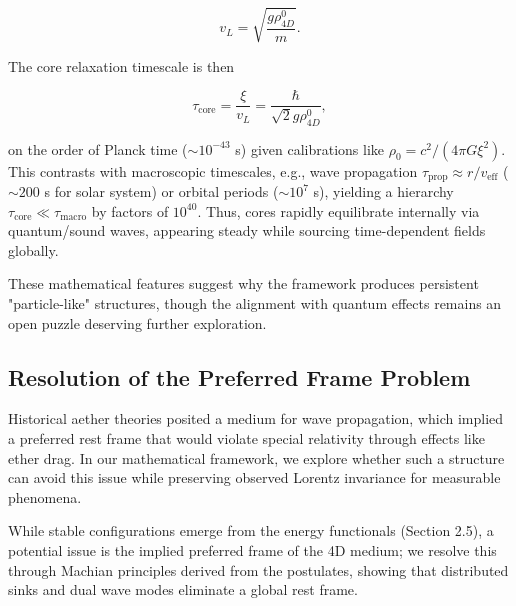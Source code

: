 \[
v_L = \sqrt{\frac{g \rho_{4D}^0}{m}}.
\]

The core relaxation timescale is then

\[
\tau_{\text{core}} = \frac{\xi}{v_L} = \frac{\hbar}{\sqrt{2} g \rho_{4D}^0},
\]

on the order of Planck time ($\sim 10^{-43}$ s) given calibrations like $\rho_0 = c^2 / (4\pi G \xi^2)$. This contrasts with macroscopic timescales, e.g., wave propagation $\tau_{\text{prop}} \approx r / v_{\text{eff}}$ ($\sim 200$ s for solar system) or orbital periods ($\sim 10^7$ s), yielding a hierarchy $\tau_{\text{core}} \ll \tau_{\text{macro}}$ by factors of $10^{40}$. Thus, cores rapidly equilibrate internally via quantum/sound waves, appearing steady while sourcing time-dependent fields globally.

\medskip
\noindent
{}
\medskip

These mathematical features suggest why the framework produces persistent "particle-like" structures, though the alignment with quantum effects remains an open puzzle deserving further exploration.

\subsection{Resolution of the Preferred Frame Problem}

Historical aether theories posited a medium for wave propagation, which implied a preferred rest frame that would violate special relativity through effects like ether drag. In our mathematical framework, we explore whether such a structure can avoid this issue while preserving observed Lorentz invariance for measurable phenomena.

While stable configurations emerge from the energy functionals (Section 2.5), a potential issue is the implied preferred frame of the 4D medium; we resolve this through Machian principles derived from the postulates, showing that distributed sinks and dual wave modes eliminate a global rest frame.

